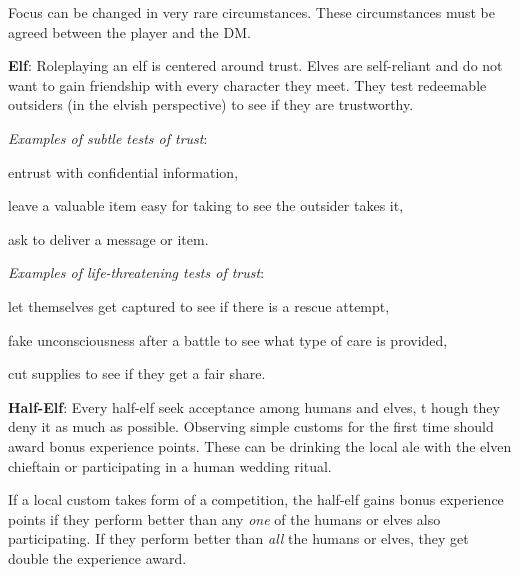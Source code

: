 Focus can be changed in very rare circumstances. These circumstances must be agreed between the player and the DM.


\textbf{Elf}: Roleplaying an elf is centered around trust. Elves are self-reliant and do not want to gain friendship with every character they meet. They test redeemable outsiders (in the elvish perspective) to see if they are trustworthy.

\textit{Examples of subtle tests of trust}:
\begin{itemize*}
	\item entrust with confidential information,
	\item leave a valuable item easy for taking to see the outsider takes it,
	\item ask to deliver a message or item.
\end{itemize*}

\textit{Examples of life-threatening tests of trust}:
\begin{itemize*}
	\item let themselves get captured to see if there is a rescue attempt,
	\item fake unconsciousness after a battle to see what type of care is provided,
	\item cut supplies to see if they get a fair share.
\end{itemize*}


\textbf{Half-Elf}: Every half-elf seek acceptance among humans and elves, t hough they deny it as much as possible. Observing simple customs for the first time should award bonus experience points. These can be drinking the local ale with the elven chieftain or participating in a human wedding ritual.

If a local custom takes form of a competition, the half-elf gains bonus experience points if they perform better than any \emph{one} of the humans or elves also participating. If they perform better than \emph{all} the humans or elves, they get double the experience award.

